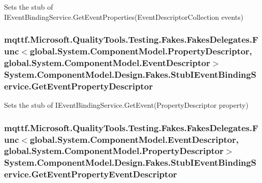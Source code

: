Sets the stub of I\-Event\-Binding\-Service.\-Get\-Event\-Properties(\-Event\-Descriptor\-Collection events)

\hypertarget{class_system_1_1_component_model_1_1_design_1_1_fakes_1_1_stub_i_event_binding_service_af717e528e4d257322255c0a6e12c50c1}{
\subsubsection[{Get\-Event\-Property\-Descriptor}]{\setlength{\rightskip}{0pt plus 5cm}mqttf.\-Microsoft.\-Quality\-Tools.\-Testing.\-Fakes.\-Fakes\-Delegates.\-Func$<$global.\-System.\-Component\-Model.\-Property\-Descriptor, global.\-System.\-Component\-Model.\-Event\-Descriptor$>$ System.\-Component\-Model.\-Design.\-Fakes.\-Stub\-I\-Event\-Binding\-Service.\-Get\-Event\-Property\-Descriptor}}\label{class_system_1_1_component_model_1_1_design_1_1_fakes_1_1_stub_i_event_binding_service_af717e528e4d257322255c0a6e12c50c1}


Sets the stub of I\-Event\-Binding\-Service.\-Get\-Event(\-Property\-Descriptor property)

\hypertarget{class_system_1_1_component_model_1_1_design_1_1_fakes_1_1_stub_i_event_binding_service_a539d00c00f5a87819514aa4b5b7bc947}{
\subsubsection[{Get\-Event\-Property\-Event\-Descriptor}]{\setlength{\rightskip}{0pt plus 5cm}mqttf.\-Microsoft.\-Quality\-Tools.\-Testing.\-Fakes.\-Fakes\-Delegates.\-Func$<$global.\-System.\-Component\-Model.\-Event\-Descriptor, global.\-System.\-Component\-Model.\-Property\-Descriptor$>$ System.\-Component\-Model.\-Design.\-Fakes.\-Stub\-I\-Event\-Binding\-Service.\-Get\-Event\-Property\-Event\-Descriptor}}\label{class_system_1_1_component_model_1_1_design_1_1_fakes_1_1_stub_i_event_binding_service_a539d00c00f5a87819514aa4b5b7bc947}


